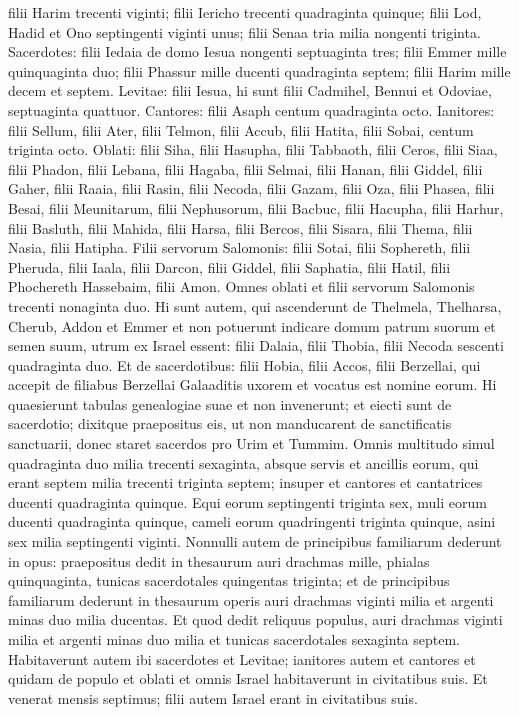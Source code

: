 \begin{biblechapter}
\verse filii Harim trecenti viginti; 
\verse filii Iericho trecenti quadraginta quinque;  
\verse filii Lod, Hadid et Ono septingenti viginti unus; 
\verse filii Senaa tria milia nongenti triginta. 
\verse Sacerdotes: filii Iedaia de domo Iesua nongenti septuaginta tres; 
\verse filii Emmer mille quinquaginta duo; 
\verse filii Phassur mille ducenti quadraginta septem; 
\verse filii Harim mille decem et septem. 
\verse Levitae: filii Iesua, hi sunt filii Cadmihel, Bennui et Odoviae, septuaginta quattuor. 
\verse Cantores: filii Asaph centum quadraginta octo. 
\verse Ianitores: filii Sellum, filii Ater, filii Telmon, filii Accub, filii Hatita, filii Sobai, centum triginta octo. 
\verse Oblati: filii Siha, filii Hasupha, filii Tabbaoth, 
\verse filii Ceros, filii Siaa, filii Phadon, 
\verse filii Lebana, filii Hagaba, filii Selmai, 
\verse filii Hanan, filii Giddel, filii Gaher, 
\verse filii Raaia, filii Rasin, filii Necoda, 
\verse filii Gazam, filii Oza, filii Phasea, 
\verse filii Besai, filii Meunitarum, filii Nephusorum, 
\verse filii Bacbuc, filii Hacupha, filii Harhur,  
\verse filii Basluth, filii Mahida, filii Harsa, 
\verse filii Bercos, filii Sisara, filii Thema, 
\verse filii Nasia, filii Hatipha. 
\verse Filii servorum Salomonis: filii Sotai, filii Sophereth, filii Pheruda, 
\verse filii Iaala, filii Darcon, filii Giddel, 
\verse filii Saphatia, filii Hatil, filii Phochereth Hassebaim, filii Amon. 
\verse Omnes oblati et filii servorum Salomonis trecenti nonaginta duo. 
\verse Hi sunt autem, qui ascenderunt de Thelmela, Thelharsa, Cherub, Addon et Emmer et non potuerunt indicare domum patrum suorum et semen suum, utrum ex Israel essent: 
\verse filii Dalaia, filii Thobia, filii Necoda sescenti quadraginta duo. 
\verse Et de sacerdotibus: filii Hobia, filii Accos, filii Berzellai, qui accepit de filiabus Berzellai Galaaditis uxorem et vocatus est nomine eorum.  
\verse Hi quaesierunt tabulas genealogiae suae et non invenerunt; et eiecti sunt de sacerdotio; 
\verse dixitque praepositus eis, ut non manducarent de sanctificatis sanctuarii, donec staret sacerdos pro Urim et Tummim. 
\verse Omnis multitudo simul quadraginta duo milia trecenti sexaginta, 
\verse absque servis et ancillis eorum, qui erant septem milia trecenti triginta septem; insuper et cantores et cantatrices ducenti quadraginta quinque. 
\verse Equi eorum septingenti triginta sex, muli eorum ducenti quadraginta quinque, 
\verse cameli eorum quadringenti triginta quinque, asini sex milia septingenti viginti. 
\verse Nonnulli autem de principibus familiarum dederunt in opus: praepositus dedit in thesaurum auri drachmas mille, phialas quinquaginta, tunicas sacerdotales quingentas triginta; 
\verse et de principibus familiarum dederunt in thesaurum operis auri drachmas viginti milia et argenti minas duo milia ducentas. 
\verse Et quod dedit reliquus populus, auri drachmas viginti milia et argenti minas duo milia et tunicas sacerdotales sexaginta septem. Habitaverunt autem ibi sacerdotes et Levitae; ianitores autem et cantores et quidam de populo et oblati et omnis Israel habitaverunt in civitatibus suis. Et venerat mensis septimus; filii autem Israel erant in civitatibus suis. 
\end{biblechapter}

